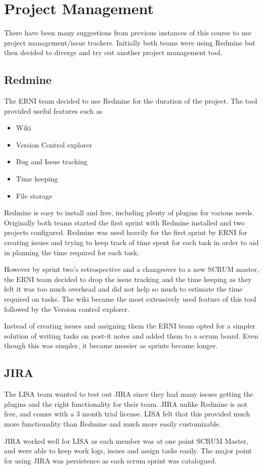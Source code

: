 \section{Project Management}

There have been many suggestions from previous instances of this course to use project management/issue trackers. Initially both teams were using Redmine but then decided to diverge and try out another project management tool. 

\subsection{Redmine}

The ERNI team decided to use Redmine for the duration of the project. The tool provided useful features such as
\begin{itemize}
\item Wiki
\item Version Control explorer
\item Bug and Issue tracking
\item Time keeping
\item File storage
\end{itemize} 

Redmine is easy to install and free, including plenty of plugins for various needs. Originally both teams started the first sprint with Redmine installed and two projects configured. Redmine was used heavily for the first sprint by ERNI for creating issues and trying to keep track of time spent for each task in order to aid in planning the time required for each task. 

However by sprint two's retrospective and a changeover to a new SCRUM master, the ERNI team decided to drop the issue tracking and the time keeping as they felt it was too much overhead and did not help so much to estimate the time required on tasks. The wiki became the most extensively used feature of this tool followed by the Version control explorer. 

Instead of creating issues and assigning them the ERNI team opted for a simpler solution of writing tasks on post-it notes and added them to a scrum board. Even though this was simpler, it became messier as sprints became longer.

\subsection{JIRA}

The LISA team wanted to test out JIRA since they had many issues getting the plugins and the right functionality for their team. JIRA unlike Redmine is not free, and comes with a 3 month trial license. LISA felt that this provided much more functionality than Redmine and much more easily customizable.

JIRA worked well for LISA as each member was at one point SCRUM Master, and were able to keep work logs, issues and assign tasks easily. The major point for using JIRA was persistence as each scrum sprint was catalogued.
